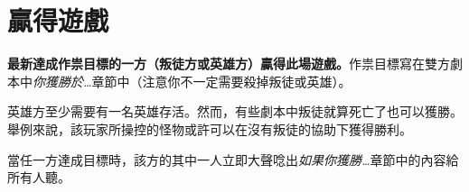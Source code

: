 
\section{贏得遊戲} \label{sec:win}

\textbf{最新達成作祟目標的一方（叛徒方或英雄方）贏得此場遊戲。}作祟目標寫在雙方劇本中\emph{你獲勝於…}章節中（注意你不一定需要殺掉叛徒或英雄）。

英雄方至少需要有一名英雄存活。然而，有些劇本中叛徒就算死亡了也可以獲勝。舉例來說，該玩家所操控的怪物或許可以在沒有叛徒的協助下獲得勝利。

當任一方達成目標時，該方的其中一人立即大聲唸出\emph{如果你獲勝…}章節中的內容給所有人聽。
